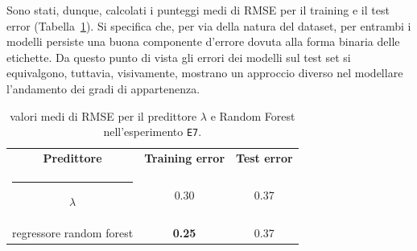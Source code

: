 \documentclass[12pt]{report}
\makeatletter
\theoremstyle{definition}
\newcommand{\thickhline}{%
    \noalign {\ifnum 0=`}\fi \hrule height 1pt
    \futurelet \reserved@a \@xhline
}
\makeatother
\begin{document}
Sono stati, dunque, calcolati i punteggi medi di RMSE per il training e il test error (Tabella~\ref{rmse_exp7}). Si specifica che, per via della natura del dataset, per entrambi i modelli persiste una buona componente d'errore dovuta alla forma binaria delle etichette. Da questo punto di vista gli errori dei modelli sul test set si equivalgono, tuttavia, visivamente, mostrano un approccio diverso nel modellare l'andamento dei gradi di appartenenza.
\begin{table}
\centering
\begin{adjustbox}{max width=\textwidth}
 \begin{tabular}{|c|c|c|} 
 \hline
\textbf{Predittore} & \textbf{Training error} & \textbf{Test error}
\\ [0.5ex] 
 \thickhline
 $\lambda$ & 0.30 & 0.37 \\
 regressore random forest & \textbf{0.25} & 0.37
 \\
 \hline
\end{tabular}
\end{adjustbox}
\caption{valori medi di RMSE per il predittore $\lambda$ e Random Forest nell'esperimento \texttt{E7}.}
\label{rmse_exp7}
\end{table}
\end{document}
